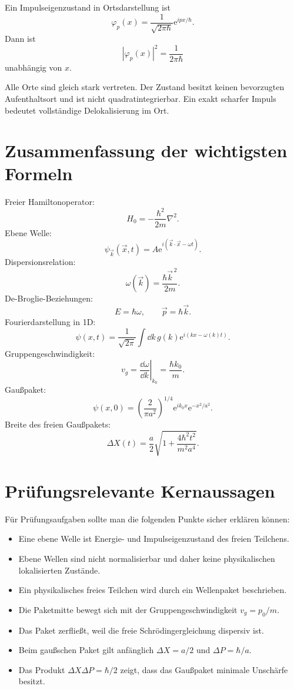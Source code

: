 Ein Impulseigenzustand in Ortsdarstellung ist
\[
    \varphi_p(x)=\frac{1}{\sqrt{2\pi\hbar}}\mathrm{e}^{ipx/\hbar}.
\]
Dann ist
\[
    |\varphi_p(x)|^2=\frac{1}{2\pi\hbar}
\]
unabhängig von $x$.

\begin{answerbox}
Alle Orte sind gleich stark vertreten. Der Zustand besitzt keinen bevorzugten Aufenthaltsort und ist nicht quadratintegrierbar. Ein exakt scharfer Impuls bedeutet vollständige Delokalisierung im Ort.
\end{answerbox}

\section{Zusammenfassung der wichtigsten Formeln}

\begin{formulabox}
Freier Hamiltonoperator:
\[
    H_0=-\frac{\hbar^2}{2m}\nabla^2.
\]
Ebene Welle:
\[
    \psi_{\vec{k}}(\vec{x},t)=A\mathrm{e}^{i(\vec{k}\cdot\vec{x}-\omega t)}.
\]
Dispersionsrelation:
\[
    \omega(\vec{k})=\frac{\hbar \vec{k}^{\,2}}{2m}.
\]
De-Broglie-Beziehungen:
\[
    E=\hbar\omega,
    \qquad
    \vec{p}=\hbar\vec{k}.
\]
Fourierdarstellung in 1D:
\[
    \psi(x,t)=\frac{1}{\sqrt{2\pi}}\int\dd k\,
    g(k)\mathrm{e}^{i(kx-\omega(k)t)}.
\]
Gruppengeschwindigkeit:
\[
    v_g=\left.\frac{\dd\omega}{\dd k}\right|_{k_0}
    =\frac{\hbar k_0}{m}.
\]
Gaußpaket:
\[
    \psi(x,0)=\left(\frac{2}{\pi a^2}\right)^{1/4}
    \mathrm{e}^{ik_0x}\mathrm{e}^{-x^2/a^2}.
\]
Breite des freien Gaußpakets:
\[
    \Delta X(t)=\frac{a}{2}
    \sqrt{1+\frac{4\hbar^2t^2}{m^2a^4}}.
\]
\end{formulabox}

\section{Prüfungsrelevante Kernaussagen}

\begin{examtipbox}
Für Prüfungsaufgaben sollte man die folgenden Punkte sicher erklären können:
\begin{itemize}
    \item Eine ebene Welle ist Energie- und Impulseigenzustand des freien Teilchens.
    \item Ebene Wellen sind nicht normalisierbar und daher keine physikalischen lokalisierten Zustände.
    \item Ein physikalisches freies Teilchen wird durch ein Wellenpaket beschrieben.
    \item Die Paketmitte bewegt sich mit der Gruppengeschwindigkeit $v_g=p_0/m$.
    \item Das Paket zerfließt, weil die freie Schrödingergleichung dispersiv ist.
    \item Beim gaußschen Paket gilt anfänglich $\Delta X=a/2$ und $\Delta P=\hbar/a$.
    \item Das Produkt $\Delta X\Delta P=\hbar/2$ zeigt, dass das Gaußpaket minimale Unschärfe besitzt.
\end{itemize}
\end{examtipbox}
